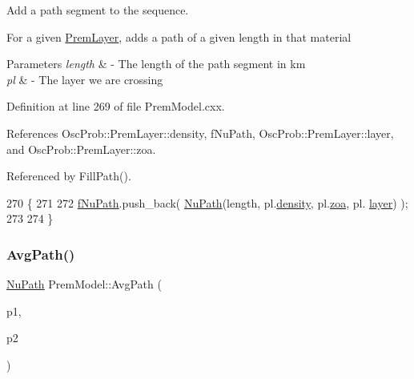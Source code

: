 Add a path segment to the sequence.

For a given \hyperlink{structOscProb_1_1PremLayer}{Prem\+Layer}, adds a path of a given length in that material


\begin{DoxyParams}{Parameters}
{\em length} & -\/ The length of the path segment in km \\
\hline
{\em pl} & -\/ The layer we are crossing \\
\hline
\end{DoxyParams}


Definition at line 269 of file Prem\+Model.\+cxx.



References Osc\+Prob\+::\+Prem\+Layer\+::density, f\+Nu\+Path, Osc\+Prob\+::\+Prem\+Layer\+::layer, and Osc\+Prob\+::\+Prem\+Layer\+::zoa.



Referenced by Fill\+Path().


\begin{DoxyCode}
270 \{
271 
272   \hyperlink{classOscProb_1_1PremModel_aaf3c77e35798d664853157013c90ad2b}{fNuPath}.push\_back( \hyperlink{structOscProb_1_1NuPath}{NuPath}(length, pl.\hyperlink{structOscProb_1_1PremLayer_aba2536cbdab87d0db33df47f95c4f2c3}{density}, pl.\hyperlink{structOscProb_1_1PremLayer_a8687a8169d786fca79908292d11077f5}{zoa}, pl.
      \hyperlink{structOscProb_1_1PremLayer_aca8d7df68e6f982155b68b7e6a7ef389}{layer}) );
273   
274 \}
\end{DoxyCode}
\mbox{\label{classOscProb_1_1PremModel_a646977424cdca178a77694397146c2f8}} 
\subsubsection{\texorpdfstring{Avg\+Path()}{AvgPath()}}
{\footnotesize\ttfamily \hyperlink{structOscProb_1_1NuPath}{Nu\+Path} Prem\+Model\+::\+Avg\+Path (\begin{DoxyParamCaption}\item[{\hyperlink{structOscProb_1_1NuPath}{Osc\+Prob\+::\+Nu\+Path}}]{p1,  }\item[{\hyperlink{structOscProb_1_1NuPath}{Osc\+Prob\+::\+Nu\+Path}}]{p2 }\end{DoxyParamCaption})\hspace{0.3cm}{\ttfamily [virtual]}}

